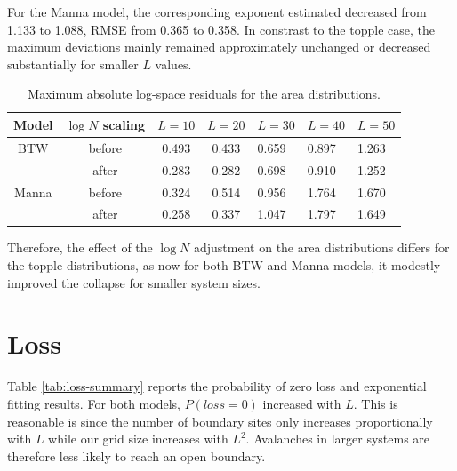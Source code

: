 For the Manna model, the corresponding exponent estimated decreased from 1.133 to 1.088, RMSE from 0.365 to 0.358. In constrast to the topple case, the maximum deviations mainly remained approximately unchanged or decreased substantially for smaller $L$ values. 

\begin{table}[htbp]
    \centering
    \begin{tabular}{cccclll}\toprule
         Model&  $\log N$ scaling&  $L=10$&  $L=20$& $L=30$& $L=40$& $L=50$\\\midrule
         BTW&  before&  0.493&  0.433& 0.659& 0.897& 1.263\\
         &  after&  0.283&  0.282& 0.698& 0.910& 1.252\\
         Manna&  before&  0.324&  0.514& 0.956& 1.764& 1.670\\
         &  after&  0.258&  0.337& 1.047& 1.797& 1.649\\ \bottomrule
    \end{tabular}
    \caption{Maximum absolute log-space residuals for the area distributions.}
    \label{tab:area-maxdev}
\end{table}

Therefore, the effect of the $\log N$ adjustment on the area
distributions differs for the topple distributions, as now for both BTW and Manna models, it modestly improved the collapse for smaller system sizes.


\section{Loss}\label{sec:loss}

Table \ref{tab:loss-summary} reports the probability of zero loss and exponential fitting results. For both models, $P(loss=0)$ increased with $L$. This is reasonable is since the number of boundary sites only increases proportionally with $L$ while our grid size increases with $L^2$. Avalanches in larger systems are therefore less likely to reach an open boundary.\\

